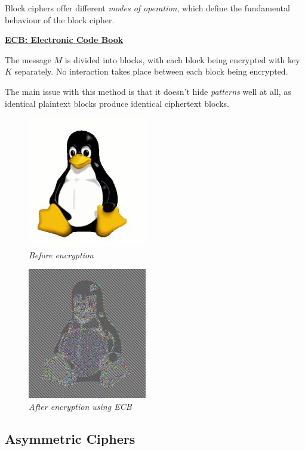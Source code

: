 \documentclass{article}
\begin{document}
Block ciphers offer different \textit{modes of operation}, which define the fundamental behaviour of the block cipher.

\textbf{\underline{ECB: Electronic Code Book}}

The message $M$ is divided into blocks, with each block being encrypted with key $K$ separately. No interaction takes place between each block being encrypted.

The main issue with this method is that it doesn't hide \textit{patterns} well at all, as identical plaintext blocks produce identical ciphertext blocks.

\begin{figure}[htb!]
  \begin{minipage}{0.5\linewidth}
    \centering
    \includegraphics[scale=0.4]{tux.jpg}\\
    \textit{Before encryption}
  \end{minipage}
  \begin{minipage}{0.5\linewidth}
    \centering
    \includegraphics[scale=0.4]{tuxecb.jpg}\\
    \textit{After encryption using ECB}
  \end{minipage}
\end{figure}

\textbf{\underline{}}

\subsection{Asymmetric Ciphers}
\end{document}
